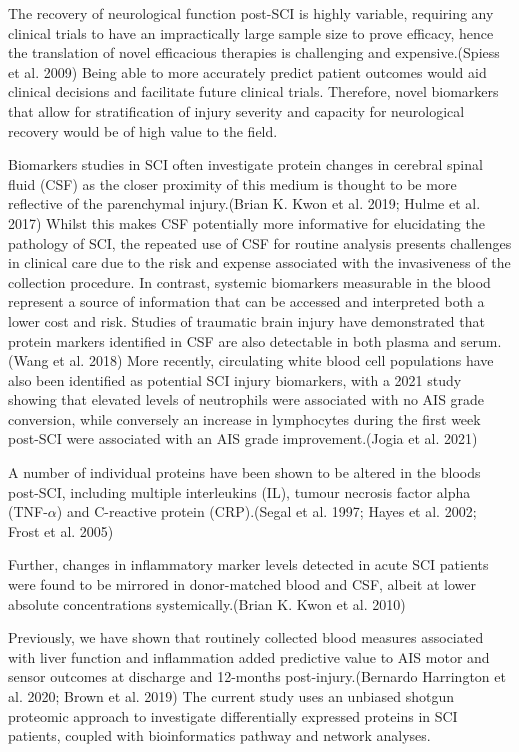 \documentclass[
]{article}
\begin{document}
The recovery of neurological function post-SCI is highly variable, requiring any clinical trials to have an impractically large sample size to prove efficacy, hence the translation of novel efficacious therapies is challenging and expensive.(Spiess et al. 2009) Being able to more accurately predict patient outcomes would aid clinical decisions and facilitate future clinical trials.
Therefore, novel biomarkers that allow for stratification of injury severity and capacity for neurological recovery would be of high value to the field.

Biomarkers studies in SCI often investigate protein changes in cerebral spinal fluid (CSF) as the closer proximity of this medium is thought to be more reflective of the parenchymal injury.(Brian K. Kwon et al. 2019; Hulme et al. 2017) Whilst this makes CSF potentially more informative for elucidating the pathology of SCI, the repeated use of CSF for routine analysis presents challenges in clinical care due to the risk and expense associated with the invasiveness of the collection procedure.
In contrast, systemic biomarkers measurable in the blood represent a source of information that can be accessed and interpreted both a lower cost and risk.
Studies of traumatic brain injury have demonstrated that protein markers identified in CSF are also detectable in both plasma and serum.(Wang et al. 2018) More recently, circulating white blood cell populations have also been identified as potential SCI injury biomarkers, with a 2021 study showing that elevated levels of neutrophils were associated with no AIS grade conversion, while conversely an increase in lymphocytes during the first week post-SCI were associated with an AIS grade improvement.(Jogia et al. 2021)

A number of individual proteins have been shown to be altered in the bloods post-SCI, including multiple interleukins (IL), tumour necrosis factor alpha (TNF-\(\alpha\)) and C-reactive protein (CRP).(Segal et al. 1997; Hayes et al. 2002; Frost et al. 2005)

Further, changes in inflammatory marker levels detected in acute SCI patients were found to be mirrored in donor-matched blood and CSF, albeit at lower absolute concentrations systemically.(Brian K. Kwon et al. 2010)

Previously, we have shown that routinely collected blood measures associated with liver function and inflammation added predictive value to AIS motor and sensor outcomes at discharge and 12-months post-injury.(Bernardo Harrington et al. 2020; Brown et al. 2019) The current study uses an unbiased shotgun proteomic approach to investigate differentially expressed proteins in SCI patients, coupled with bioinformatics pathway and network analyses.
\end{document}

